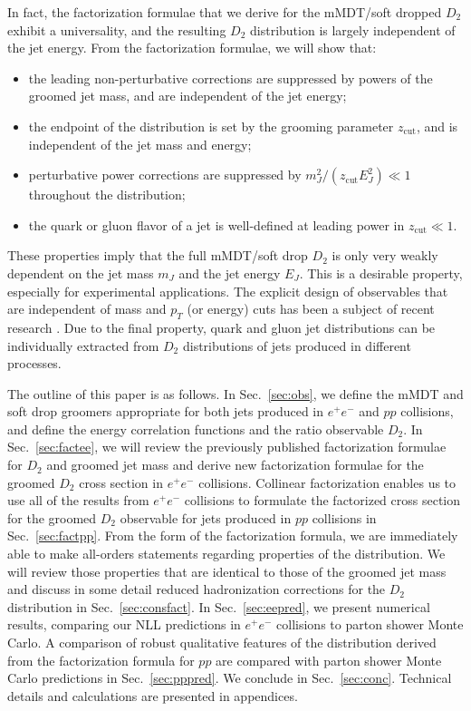 \documentclass[a4paper,11pt]{article}
\def\zcut{z_{\text{cut}}}
\DeclareRobustCommand{\Sec}[1]{Sec.~\ref{#1}}
\begin{document}
In fact, the factorization formulae that we derive for the mMDT/soft dropped $D_2$ exhibit a universality, and the resulting $D_2$ distribution is largely independent of the jet energy.  From the factorization formulae, we will show that:
\begin{itemize}
\item the leading non-perturbative corrections are suppressed by powers of the groomed jet mass, and are independent of the jet energy;
\item the endpoint of the distribution is set by the grooming parameter $\zcut$, and is independent of the jet mass and energy;
\item perturbative power corrections are suppressed by $m_J^2/(\zcut E_J^2)\ll 1$ throughout the distribution;
\item the quark or gluon flavor of a jet is well-defined at leading power in $\zcut \ll 1$. 
\end{itemize}
These properties imply that the full mMDT/soft drop $D_2$ is only very weakly dependent on the jet mass $m_J$ and the jet energy $E_J$. This is a desirable property, especially for experimental applications. The explicit design of observables that are independent of mass and $p_T$ (or energy) cuts has been a subject of recent research \cite{Dolen:2016kst,Moult:2016cvt}.  Due to the final property, quark and gluon jet distributions can be individually extracted from $D_2$ distributions of jets produced in different processes. 



The outline of this paper is as follows.  In \Sec{sec:obs}, we define the mMDT and soft drop groomers appropriate for both jets produced in $e^+e^-$ and $pp$ collisions, and define the energy correlation functions and the ratio observable $D_2$.  In \Sec{sec:factee}, we will review the previously published factorization formulae for $D_2$ and groomed jet mass and derive new factorization formulae for the groomed $D_2$ cross section in $e^+e^-$ collisions.  Collinear factorization enables us to use all of the results from $e^+e^-$ collisions to formulate the factorized cross section for the groomed $D_2$ observable for jets produced in $pp$ collisions in \Sec{sec:factpp}.  From the form of the factorization formula, we are immediately able to make all-orders statements regarding properties of the distribution.  We will review those properties that are identical to those of the groomed jet mass and discuss in some detail reduced hadronization corrections for the $D_2$ distribution in \Sec{sec:consfact}.  In \Sec{sec:eepred}, we present numerical results, comparing our NLL predictions in $e^+e^-$ collisions to parton shower Monte Carlo. A comparison of robust qualitative features of the distribution derived from the factorization formula for $pp$ are compared with parton shower Monte Carlo predictions in \Sec{sec:pppred}. We conclude in \Sec{sec:conc}.  Technical details and calculations are presented in appendices.
\end{document}
